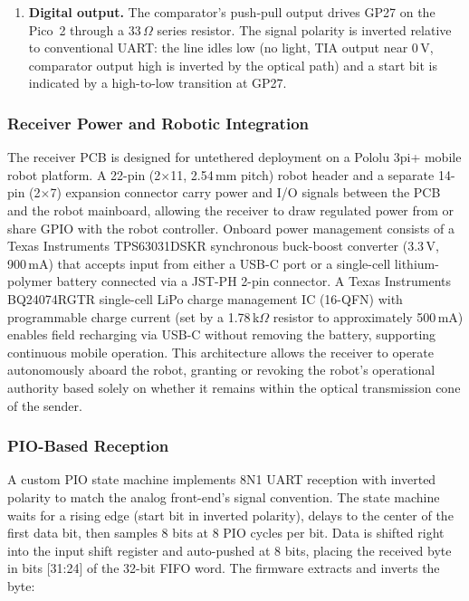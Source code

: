 \documentclass[conference]{IEEEtran}
\begin{document}
\begin{enumerate}
\item \textbf{Digital output.} The comparator's push-pull output drives GP27 on the Pico~2 through a 33\,$\Omega$ series resistor. The signal polarity is inverted relative to conventional UART: the line idles low (no light, TIA output near 0\,V, comparator output high is inverted by the optical path) and a start bit is indicated by a high-to-low transition at GP27.
\end{enumerate}

\subsubsection{Receiver Power and Robotic Integration}

The receiver PCB is designed for untethered deployment on a Pololu 3pi+ mobile robot platform. A 22-pin (2$\times$11, 2.54\,mm pitch) robot header and a separate 14-pin (2$\times$7) expansion connector carry power and I/O signals between the PCB and the robot mainboard, allowing the receiver to draw regulated power from or share GPIO with the robot controller. Onboard power management consists of a Texas Instruments TPS63031DSKR synchronous buck-boost converter (3.3\,V, 900\,mA) that accepts input from either a USB-C port or a single-cell lithium-polymer battery connected via a JST-PH 2-pin connector. A Texas Instruments BQ24074RGTR single-cell LiPo charge management IC (16-QFN) with programmable charge current (set by a 1.78\,k$\Omega$ resistor to approximately 500\,mA) enables field recharging via USB-C without removing the battery, supporting continuous mobile operation. This architecture allows the receiver to operate autonomously aboard the robot, granting or revoking the robot's operational authority based solely on whether it remains within the optical transmission cone of the sender.

\subsubsection{PIO-Based Reception}

A custom PIO state machine implements 8N1 UART reception with inverted polarity to match the analog front-end's signal convention. The state machine waits for a rising edge (start bit in inverted polarity), delays to the center of the first data bit, then samples 8 bits at 8 PIO cycles per bit. Data is shifted right into the input shift register and auto-pushed at 8 bits, placing the received byte in bits [31:24] of the 32-bit FIFO word. The firmware extracts and inverts the byte:
\end{document}
